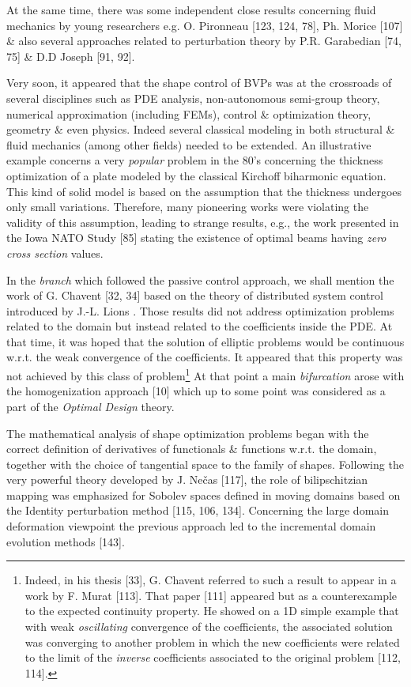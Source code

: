 \documentclass[oneside]{book}
\numberwithin{equation}{section}
\begin{document}
At the same time, there was some independent close results concerning fluid mechanics by young researchers e.g. O. Pironneau [123, 124, 78], Ph. Morice [107] \& also several approaches related to perturbation theory by P.R. Garabedian [74, 75] \& D.D Joseph [91, 92].

Very soon, it appeared that the shape control of BVPs was at the crossroads of several disciplines such as PDE analysis, non-autonomous semi-group theory, numerical approximation (including FEMs), control \& optimization theory, geometry \& even physics. Indeed several classical modeling in both structural \& fluid mechanics (among other fields) needed to be extended. An illustrative example concerns a very \textit{popular} problem in the 80's concerning the thickness optimization of a plate modeled by the classical Kirchoff biharmonic equation. This kind of solid model is based on the assumption that the thickness undergoes only small variations. Therefore, many pioneering works were violating the validity of this assumption, leading to strange results, e.g., the work presented in the Iowa NATO Study [85] stating the existence of optimal beams having \textit{zero cross section} values.

In the \textit{branch} which followed the passive control approach, we shall mention the work of G. Chavent [32, 34] based on the theory of distributed system control introduced by J.-L. Lions \cite{Lions1971}. Those results did not address optimization problems related to the domain but instead related to the coefficients inside the PDE. At that time, it was hoped that the solution of elliptic problems would be continuous w.r.t. the weak convergence of the coefficients. It appeared that this property was not achieved by this class of problem\footnote{Indeed, in his thesis [33], G. Chavent referred to such a result to appear in a work by F. Murat [113]. That paper [111] appeared but as a counterexample to the expected continuity property. He showed on a 1D simple example that with weak \textit{oscillating} convergence of the coefficients, the associated solution was converging to another problem in which the new coefficients were related to the limit of the \textit{inverse} coefficients associated to the original problem [112, 114].} At that point a main \textit{bifurcation} arose with the homogenization approach [10] which up to some point was considered as a part of the \textit{Optimal Design} theory.

The mathematical analysis of shape optimization problems began with the correct definition of derivatives of functionals \& functions w.r.t. the domain, together with the choice of tangential space to the family of shapes. Following the very powerful theory developed by J. Ne\v{c}as [117], the role of bilipschitzian mapping was emphasized for Sobolev spaces defined in moving domains based on the Identity perturbation method [115, 106, 134]. Concerning the large domain deformation viewpoint the previous approach led to the incremental domain evolution methods [143].
\end{document}
